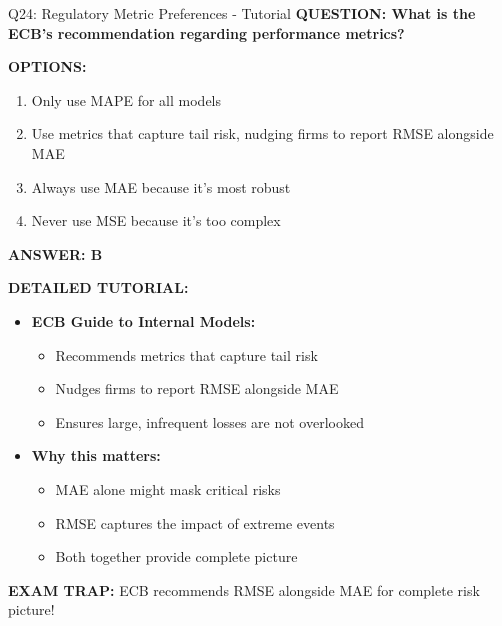 \documentclass[8pt]{beamer}
\begin{document}
	\begin{frame}{Q24: Regulatory Metric Preferences - Tutorial}
		\fontsize{6.5}{7.5}\selectfont
		\textbf{QUESTION: What is the ECB's recommendation regarding performance metrics?}
		
		\vspace{0.1cm}
		\textbf{OPTIONS:}
		\begin{enumerate}
			\item Only use MAPE for all models
			\item Use metrics that capture tail risk, nudging firms to report RMSE alongside MAE
			\item Always use MAE because it's most robust
			\item Never use MSE because it's too complex
		\end{enumerate}
		
		\vspace{0.1cm}
		\textcolor{myblue}{\textbf{ANSWER: B}}
		
		\vspace{0.1cm}
		\textbf{DETAILED TUTORIAL:}
		\begin{itemize}
			\item \textbf{ECB Guide to Internal Models:}
			\begin{itemize}
				\item Recommends metrics that capture tail risk
				\item Nudges firms to report RMSE alongside MAE
				\item Ensures large, infrequent losses are not overlooked
			\end{itemize}
			\item \textbf{Why this matters:}
			\begin{itemize}
				\item MAE alone might mask critical risks
				\item RMSE captures the impact of extreme events
				\item Both together provide complete picture
			\end{itemize}
		\end{itemize}
		
		\textcolor{myred}{\textbf{EXAM TRAP:}} ECB recommends \textcolor{myblue}{RMSE alongside MAE} for complete risk picture!
	\end{frame}
	
\end{document}
